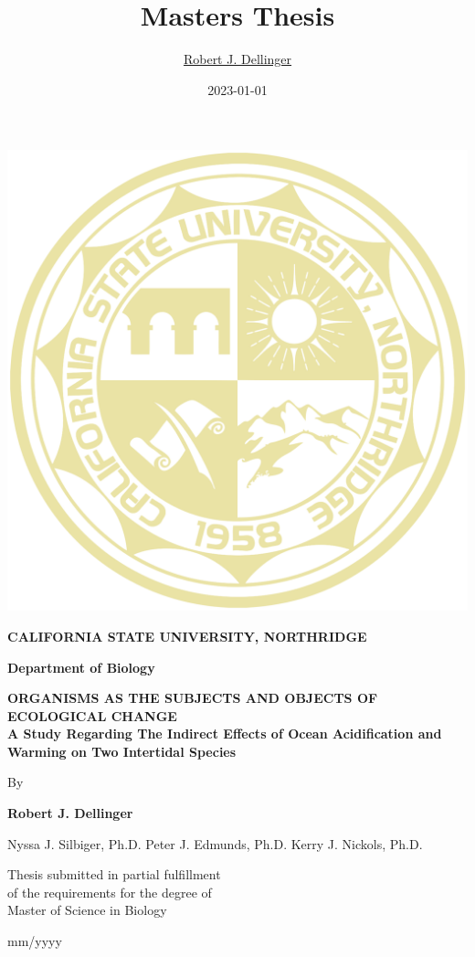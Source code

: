 \documentclass[
  11pt,
]{article}
\title{Masters Thesis}
\author{\href{https://robdellinger.com}{Robert J. Dellinger}}
\date{2023-01-01}
\begin{document}
\maketitle

\newpage

\allsectionsfont{\centering}
\subsectionfont{\raggedright}
\subsubsectionfont{\raggedright}

\begin{centering}

\vspace{3cm}

\vspace{1cm}


\includegraphics[width=0.3\linewidth]{Images/university_logo} 

\vspace{0.5cm}
\Large
{\bf CALIFORNIA STATE UNIVERSITY, NORTHRIDGE}

\Large
{\bf Department of Biology}
\vspace{1cm}
\Large

\doublespacing
{\bf ORGANISMS AS THE SUBJECTS AND OBJECTS OF ECOLOGICAL CHANGE \\
A Study Regarding The Indirect Effects of Ocean Acidification and Warming
on Two Intertidal Species\\}


\normalsize
\singlespacing
By

\vspace{0.5 cm}

\Large
{\bf Robert J. Dellinger}

\vspace{0.5 cm}
{Nyssa J. Silbiger, Ph.D.}
{Peter J. Edmunds, Ph.D.}
{Kerry J. Nickols, Ph.D.}


\vspace{1.5 cm}
Thesis submitted in partial fulfillment \\
of the requirements for the degree of  \\
Master of Science in Biology \\
\vspace{1.5 cm}

\normalsize
mm/yyyy

\end{centering}
\newpage
\end{document}
